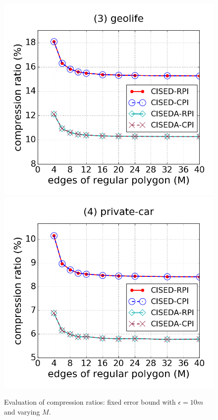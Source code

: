 \begin{figure}[tb!]
\includegraphics[scale = 0.250]{figures/Exp-M-e-10-CR-geolife.png}
\includegraphics[scale = 0.250]{figures/Exp-M-e-10-CR-private.png}
\vspace{-2ex}
\caption{\small Evaluation of compression ratios: fixed error bound with $\epsilon=10m$ and varying $M$.}
\label{fig:m-cr-e20}
\vspace{-2ex}
\end{figure}

